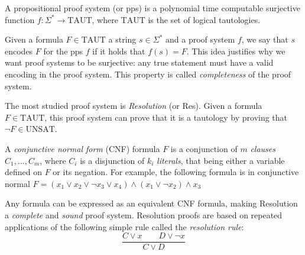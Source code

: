 \begin{definition}
 A propositional proof system (or pps) is a polynomial time computable surjective function $f : \Sigma^* \to \mathrm{TAUT}$, where $\mathrm{TAUT}$ is the set of logical tautologies.
\end{definition}

Given a formula $F \in \mathrm{TAUT}$ a string $s \in \Sigma^*$ and a proof system $f$, we say that $s$ encodes $F$ for the pps $f$ if it holds that $f(s) = F$. This idea justifies why we want proof systems to be surjective: any true statement must have a valid encoding in the proof system. This property is called \textit{completeness} of the proof system.

The most studied proof system is \textit{Resolution} (or \textsf{Res}). Given a formula $F \in \mathrm{TAUT}$, this proof system can prove that it is a tautology by proving that $\lnot F \in \mathrm{UNSAT}$.

A \textit{conjunctive normal form} (CNF) formula $F$ is a conjunction of $m$ \textit{clauses} $C_1, \ldots, C_m$, where $C_i$ is a disjunction of $k_i$ \textit{literals}, that being either a variable defined on $F$ or its negation. For example, the following formula is in conjunctive normal $F = (x_1 \lor x_2 \lor \lnot{x_3} \lor x_4) \land (x_1 \lor \lnot{x_2}) \land x_3$

Any formula can be expressed as an equivalent CNF formula, making Resolution a \textit{complete} and \textit{sound} proof system. Resolution proofs are based on repeated applications of the following simple rule called the \textit{resolution rule}:
\[\dfrac{C \lor x \qquad D \lor \lnot x}{C \lor D}\]

